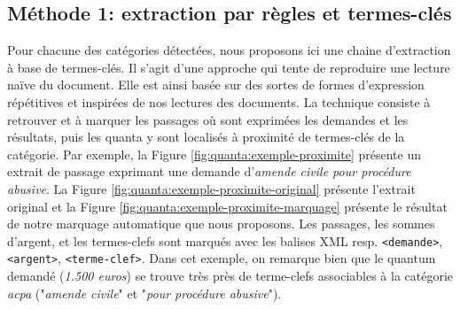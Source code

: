 \subsection{Méthode 1: extraction par règles et termes-clés}
\label{subsec:quanta:attributs:regles}

Pour chacune des catégories détectées, nous proposons ici une chaine d'extraction à base de termes-clés. Il s'agit d'une approche qui tente de reproduire une lecture naïve du document. Elle est ainsi basée sur des sortes de formes d'expression répétitives et inspirées de nos lectures des documents. La technique consiste à retrouver et à marquer les passages où sont exprimées les demandes et les résultats, puis les quanta y sont localisés à proximité de termes-clés de la catégorie. Par exemple, la Figure \ref{fig:quanta:exemple-proximite} présente un extrait de passage exprimant une demande d'\textit{amende civile pour procédure abusive}. La Figure \ref{fig:quanta:exemple-proximite-original} présente l'extrait original et la Figure \ref{fig:quanta:exemple-proximite-marquage} présente le résultat de notre marquage automatique que nous proposons. Les passages, les sommes d'argent, et les termes-clefs sont marqués avec les balises XML resp. \verb=<demande>=, \verb=<argent>=, \verb=<terme-clef>=. Dans cet exemple, on remarque bien que le quantum demandé (\textit{1.500 euros}) se trouve très près de terme-clefs associables à la catégorie \textit{acpa} ("\textit{amende civile}" et "\textit{pour procédure abusive}"). 

